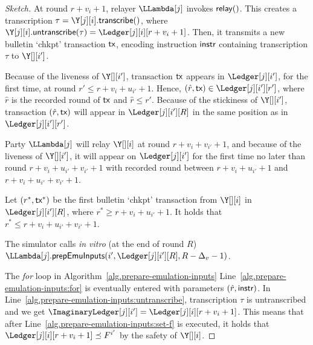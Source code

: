\begin{proof}[Sketch]



  At round $r + v_i + 1$, relayer $\LLambda[j]$ invokes $\textsf{relay}()$.
  This creates a transcription $\tau = \Y[j][i].\transcribe()$, where
  $\Y[j][i].\untranscribe(\tau) = \Ledger[j][i][r + v_i + 1]$.
  Then, it transmits a new bulletin `chkpt'
  transaction $\textsf{tx}$, encoding instruction $\textsf{instr}$ containing transcription $\tau$ to $\Y[][i']$.

  Because of the liveness of $\Y[][i']$,
  transaction $\textsf{tx}$ appears in $\Ledger[j][i']$, for the first time,
  at round $r' \leq r + v_i + u_{i'} + 1$.
  Hence, $(\hat{r}, \tx) \in \Ledger[j][i'][r']$, where $\hat{r}$ is the recorded round of $\textsf{tx}$
  and $\hat{r} \leq r'$. Because of the stickiness of $\Y[][i']$, transaction $(\hat{r}, \textsf{tx})$ will
  appear in $\Ledger[j][i'][R]$ in the same position as in $\Ledger[j][i'][r']$.

  Party $\LLambda[j]$ will relay $\Y[][i]$ at round $r + v_i + v_{i'} + 1$, and
  because of the liveness of $\Y[][i']$, it will appear on $\Ledger[j][i']$ for the
  first time no later than round $r + v_i + u_{i'} + v_{i'} + 1$ with recorded round
  between $r + v_i + u_{i'} + 1$ and $r + v_i + u_{i'} + v_{i'} + 1$.

  Let $(r^*, \textsf{tx}^*)$ be the first bulletin `chkpt' transaction from $\Y[][i]$ in $\Ledger[j][i'][R]$, where
  $r^* \geq r + v_{i} + u_{i'} + 1$. It holds that $r^* \leq r + v_{i} + u_{i'} + v_{i'} + 1$.

  The simulator calls \emph{in vitro} (at the end of round $R$)
  $\LLambda[j].\prepareEmulationInputs(i', \Ledger[j][i'][R], R - \Delta_v - 1)$.

  The \emph{for} loop in Algorithm~\ref{alg.prepare-emulation-inputs}
  Line~\ref{alg.prepare-emulation-inputs:for} is eventually entered with
  parameters $(\hat{r}, \textsf{instr})$.
  In Line~\ref{alg.prepare-emulation-inputs:untranscribe}, transcription $\tau$
  is untranscribed and we get $\ImaginaryLedger[j][i'] = \Ledger[j][i][r + v_i + 1]$.
  This means that after Line~\ref{alg.prepare-emulation-inputs:set-f} is executed,
  it holds that $\Ledger[j][i][r + v_i + 1] \preceq F^{i'}$ by the safety of $\Y[][i]$.


\end{proof}
